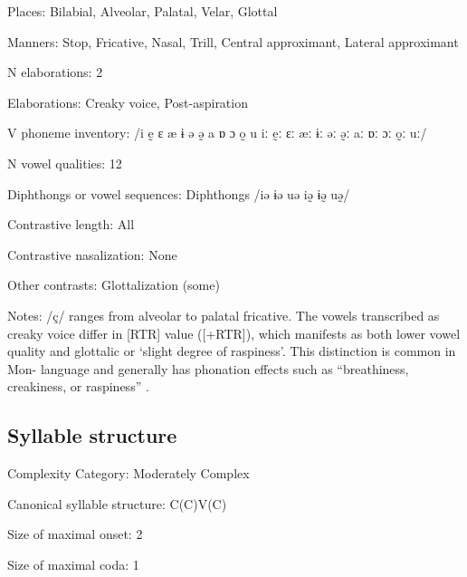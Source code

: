 {\begin{appendixdesc}
\item[Places:] Bilabial, Alveolar, Palatal, Velar, Glottal

\item[Manners:] Stop, Fricative, Nasal, Trill, Central approximant, Lateral approximant

\item[N elaborations:] 2

\item[Elaborations:] Creaky voice, Post-aspiration

\item[V phoneme inventory:] /i ḛ ɛ æ ɨ ə ə̰ a ɒ ɔ o̰ u iː ḛː ɛː æː ɨː əː ə̰ː aː ɒː ɔː o̰ː uː/

\item[N vowel qualities:] 12

\item[Diphthongs or vowel sequences:] Diphthongs /iə ɨə uə iə̰ ɨə̰ uə̰/

\item[Contrastive length:] All

\item[Contrastive nasalization:] None

\item[Other contrasts:] Glottalization (some)

\item[Notes:] /ç/ ranges from alveolar to palatal fricative. The vowels transcribed as creaky voice differ in [RTR] value ([+RTR]), which manifests as both lower vowel quality and glottalic or ‘slight degree of raspiness’. This distinction is common in Mon- language and generally has phonation effects such as “breathiness, creakiness, or raspiness” \citep[14]{Alves2006}.
\end{appendixdesc}
\subsection*{Syllable structure}
\begin{appendixdesc}

\item[Complexity Category:] Moderately Complex

\item[Canonical syllable structure:] C(C)V(C) \citep[17--21]{Alves2006}

\item[Size of maximal onset:] 2

\item[Size of maximal coda:] 1


\end{appendixdesc}}
